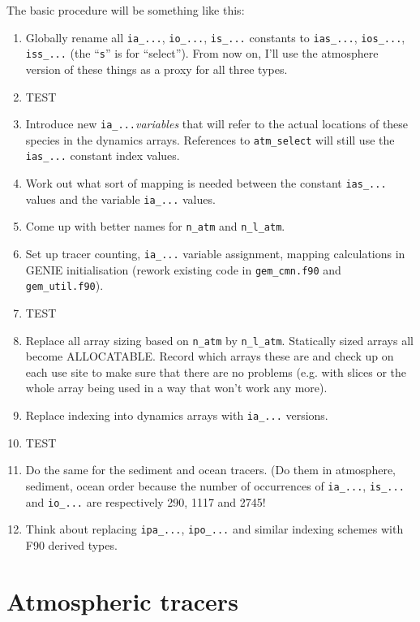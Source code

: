 \documentclass[a4paper,10pt,article]{memoir}
\begin{document}
The basic procedure will be something like this:
\begin{enumerate}
  \item{Globally rename all \texttt{ia\_...}, \texttt{io\_...},
    \texttt{is\_...} constants to \texttt{ias\_...},
    \texttt{ios\_...}, \texttt{iss\_...} (the ``\texttt{s}'' is for
    ``select'').  From now on, I'll use the atmosphere version of
    these things as a proxy for all three types.}
  \item{TEST}
  \item{Introduce new \texttt{ia\_...}\emph{variables} that will refer
    to the actual locations of these species in the dynamics arrays.
    References to \texttt{atm\_select} will still use the
    \texttt{ias\_...} constant index values.}
  \item{Work out what sort of mapping is needed between the constant
    \texttt{ias\_...} values and the variable \texttt{ia\_...}
    values.}
  \item{Come up with better names for \texttt{n\_atm} and
    \texttt{n\_l\_atm}.}
  \item{Set up tracer counting, \texttt{ia\_...} variable assignment,
    mapping calculations in GENIE initialisation (rework existing code
    in \texttt{gem\_cmn.f90} and \texttt{gem\_util.f90}).}
  \item{TEST}
  \item{Replace all array sizing based on \texttt{n\_atm} by
    \texttt{n\_l\_atm}.  Statically sized arrays all become
    ALLOCATABLE.  Record which arrays these are and check up on each
    use site to make sure that there are no problems (e.g. with slices
    or the whole array being used in a way that won't work any more).}
  \item{Replace indexing into dynamics arrays with \texttt{ia\_...}
    versions.}
  \item{TEST}
  \item{Do the same for the sediment and ocean tracers.  (Do them in
    atmosphere, sediment, ocean order because the number of
    occurrences of \texttt{ia\_...}, \texttt{is\_...} and
    \texttt{io\_...} are respectively 290, 1117 and 2745!}
  \item{Think about replacing \texttt{ipa\_...}, \texttt{ipo\_...} and
    similar indexing schemes with F90 derived types.}
\end{enumerate}

\section{Atmospheric tracers}
\end{document}
